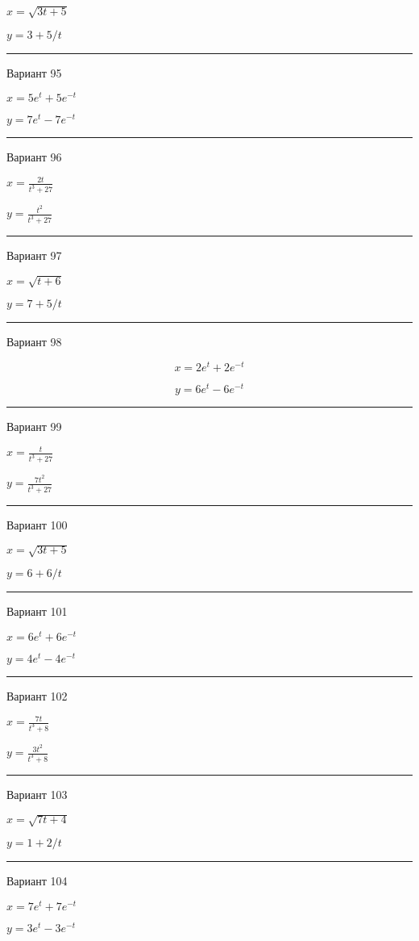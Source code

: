 \documentclass[11pt]{report}
\begin{document}
$x = \sqrt{3 t + 5}$

$y = 3 + 5 / t$

\rule{\textwidth}{.2mm}

 Вариант 95

$x = 5 e^{t} + 5 e^{- t}$

$y = 7 e^{t} - 7 e^{- t}$

\rule{\textwidth}{.2mm}

 Вариант 96

$x = \frac{2 t}{t^{3} + 27}$

$y = \frac{t^{2}}{t^{3} + 27}$

\rule{\textwidth}{.2mm}

 Вариант 97

$x = \sqrt{t + 6}$

$y = 7 + 5 / t$

\rule{\textwidth}{.2mm}

 Вариант 98

$$x = 2 e^{t} + 2 e^{- t}$$

$$y = 6 e^{t} - 6 e^{- t}$$

\rule{\textwidth}{.2mm}

 Вариант 99

$x = \frac{t}{t^{3} + 27}$

$y = \frac{7 t^{2}}{t^{3} + 27}$

\rule{\textwidth}{.2mm}

 Вариант 100

$x = \sqrt{3 t + 5}$

$y = 6 + 6 / t$

\rule{\textwidth}{.2mm}

 Вариант 101

$x = 6 e^{t} + 6 e^{- t}$

$y = 4 e^{t} - 4 e^{- t}$

\rule{\textwidth}{.2mm}

 Вариант 102

$x = \frac{7 t}{t^{3} + 8}$

$y = \frac{3 t^{2}}{t^{3} + 8}$

\rule{\textwidth}{.2mm}

 Вариант 103

$x = \sqrt{7 t + 4}$

$y = 1 + 2 / t$

\rule{\textwidth}{.2mm}

 Вариант 104

$x = 7 e^{t} + 7 e^{- t}$

$y = 3 e^{t} - 3 e^{- t}$
\end{document}
